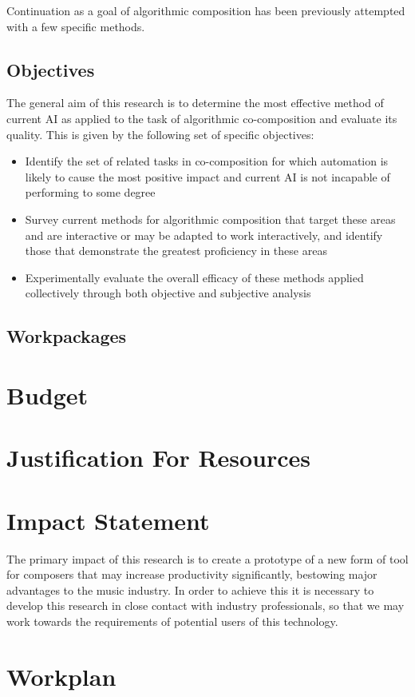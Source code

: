 \documentclass[11pt]{article}
\begin{document}
	Continuation as a goal of algorithmic composition has been previously attempted with a few specific methods. 
	
	\subsection{Objectives}
	
	The general aim of this research is to determine the most effective method of current AI as applied to the task of algorithmic co-composition and evaluate its quality. This is given by the following set of specific objectives:
	 
	\begin{itemize}
		\item Identify the set of related tasks in co-composition for which automation is likely to cause the most positive impact and current AI is not incapable of performing to some degree
		\item Survey current methods for algorithmic composition that target these areas and are interactive or may be adapted to work interactively, and identify those that demonstrate the greatest proficiency in these areas
		\item Experimentally evaluate the overall efficacy of these methods applied collectively through both objective and subjective analysis
	\end{itemize}
	
	\subsection{Workpackages}
	
	\section{Budget}
	
	\section{Justification For Resources}
	
	\section{Impact Statement}
	
	The primary impact of this research is to create a prototype of a new form of tool for composers that may increase productivity significantly, bestowing major advantages to the music industry. In order to achieve this it is necessary to develop this research in close contact with industry professionals, so that we may work towards the requirements of potential users of this technology. 
	
	\section{Workplan}
	
	\printbibliography
	
\end{document}
